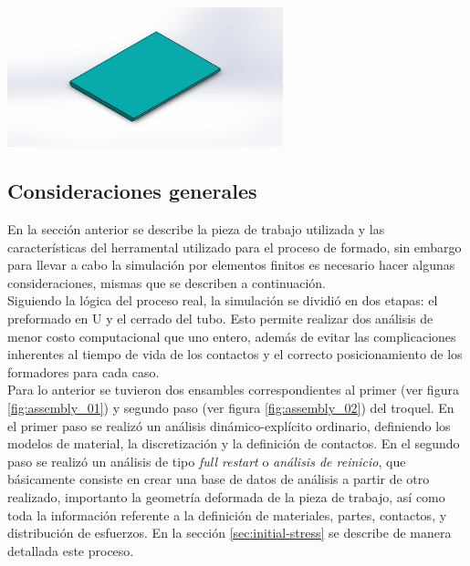 \begin{center}
\includegraphics[width=0.6\textwidth]{src/ch3/blank.jpg}
\label{fig:blank_inicial}
\end{center}

\subsection{Consideraciones generales}\label{sec:consideraciones-generales}

En la sección anterior se describe la pieza de trabajo utilizada y las características del herramental 
utilizado para el proceso de formado, sin embargo para llevar a cabo la simulación por elementos 
finitos es necesario hacer algunas consideraciones, mismas que se describen a continuación.\\

Siguiendo la lógica del proceso real, la simulación se dividió en dos etapas: el preformado en U y 
el cerrado del tubo. Esto permite realizar dos análisis de menor costo computacional que uno entero, 
además de evitar las complicaciones inherentes al tiempo de vida de los contactos y el correcto 
posicionamiento de los formadores para cada caso.\\

Para lo anterior se tuvieron dos ensambles correspondientes al primer (ver figura \ref{fig:assembly_01}) y 
segundo paso (ver figura \ref{fig:assembly_02}) del troquel. En el primer paso se realizó 
un análisis dinámico-explícito ordinario, definiendo los modelos de material, la discretización y 
la definición de contactos. En el segundo paso se realizó un análisis de tipo \textit{full restart} o 
\textit{análisis de reinicio}, que básicamente consiste en crear una base de datos de análisis a 
partir de otro realizado, importanto la geometría deformada de la pieza de trabajo, así como toda 
la información referente a la definición de materiales, partes, contactos, y distribución de esfuerzos. 
En la sección \ref{sec:initial-stress} se describe de manera detallada este proceso. \\

